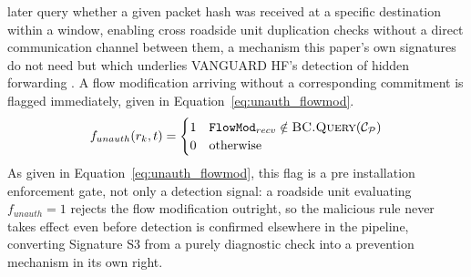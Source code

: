 \documentclass[final,5p,twocolumn]{elsarticle}
\theoremstyle{remark}
\theoremstyle{plain}
\begin{document}
later query whether a given packet hash was received at a specific
destination within a window, enabling cross roadside unit duplication checks
without a direct communication channel between them, a mechanism this
paper's own signatures do not need but which underlies VANGUARD HF's
detection of hidden forwarding \cite{VanguardHF2026}. A flow modification
arriving without a corresponding commitment is flagged immediately, given in
Equation~\eqref{eq:unauth_flowmod}.
\begin{equation}
	f_{unauth}(r_k, t) =
	\begin{cases}
		1 & \texttt{FlowMod}_{recv} \notin \textsc{BC.Query}(\mathcal{C}_{\mathcal{P}}) \\
		0 & \text{otherwise}
	\end{cases}
	\label{eq:unauth_flowmod}
\end{equation}
As given in Equation~\eqref{eq:unauth_flowmod}, this flag is a
pre installation enforcement gate, not only a detection signal: a roadside
unit evaluating $f_{unauth} = 1$ rejects the flow modification outright, so
the malicious rule never takes effect even before detection is confirmed
elsewhere in the pipeline, converting Signature S3 from a purely diagnostic
check into a prevention mechanism in its own right.
\end{document}
